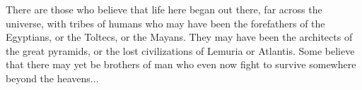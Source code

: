 There are those who believe that life here began out there, far across the universe, with tribes of humans who may have been the forefathers of the Egyptians, or the Toltecs, or the Mayans. They may have been the architects of the great pyramids, or the lost civilizations of Lemuria or Atlantis. Some believe that there may yet be brothers of man who even now fight to survive somewhere beyond the heavens...
